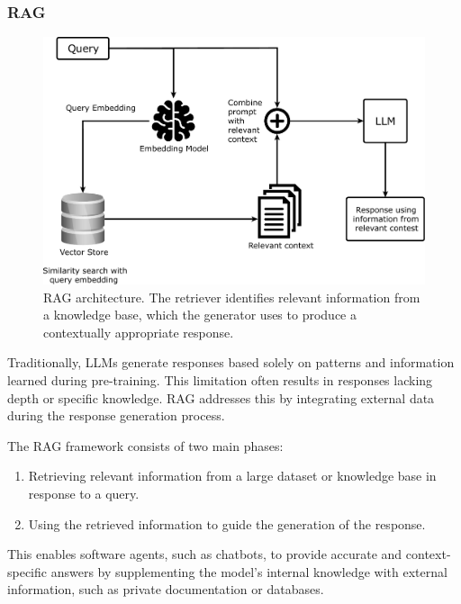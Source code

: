 \subsubsection{\gls{RAG}}
%
\begin{figure}
    \centering
    \includegraphics[width=0.8\linewidth]{figures/rag-architecture}
    \caption[\Gls{RAG} architecture]{
        \Gls{RAG} architecture.
        The retriever identifies relevant information from a knowledge base, which the generator uses to produce a contextually appropriate response.
    }
    \label{fig:rag-architecture}
\end{figure}
%
Traditionally, \glspl{LLM} generate responses based solely on patterns and information learned during pre-training.
%
This limitation often results in responses lacking depth or specific knowledge.
%
\gls{RAG} addresses this by integrating external data during the response generation process.

The \gls{RAG} framework consists of two main phases:
%
\begin{enumerate}
    \item Retrieving relevant information from a large dataset or knowledge base in response to a query.
    \item Using the retrieved information to guide the generation of the response.
\end{enumerate}
%
This enables software agents, such as chatbots, to provide accurate and context-specific answers by supplementing the model's internal knowledge with external information, such as private documentation or databases.

